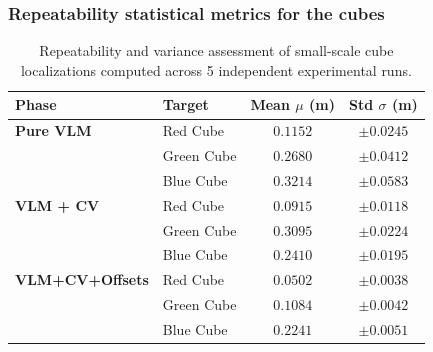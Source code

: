 \subsubsection{Repeatability statistical metrics for the cubes}
\begin{table}[H]
	\centering
	\small
	\begin{tabularx}{0.85\textwidth}{l X c c}
		\toprule
		\textbf{Phase} & \textbf{Target} & \textbf{Mean $\mu$ (m)} & \textbf{Std $\sigma$ (m)} \\
		\midrule
		\textbf{Pure VLM}  
		& Red Cube    & $0.1152$ & $\pm 0.0245$ \\
		& Green Cube  & $0.2680$ & $\pm 0.0412$ \\
		& Blue Cube   & $0.3214$ & $\pm 0.0583$ \\
		\midrule
		\textbf{VLM + CV}  
		& Red Cube    & $0.0915$ & $\pm 0.0118$ \\
		& Green Cube  & $0.3095$ & $\pm 0.0224$ \\
		& Blue Cube   & $0.2410$ & $\pm 0.0195$ \\
		\midrule
		\textbf{VLM+CV+Offsets}  
		& Red Cube    & $\mathbf{0.0502}$ & $\pm \mathbf{0.0038}$ \\
		& Green Cube  & $\mathbf{0.1084}$ & $\pm \mathbf{0.0042}$ \\
		& Blue Cube   & $\mathbf{0.2241}$ & $\pm \mathbf{0.0051}$ \\
		\bottomrule
	\end{tabularx}
	\caption{Repeatability and variance assessment of small-scale cube localizations computed across 5 independent experimental runs.}
	\label{tab:cube_repeatability}
\end{table}

